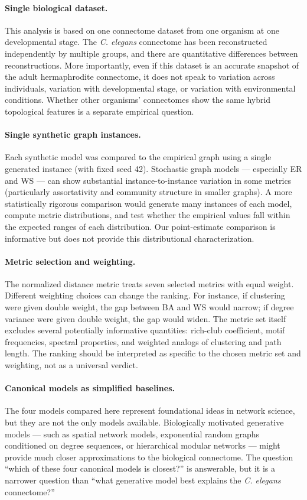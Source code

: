 \documentclass[12pt,a4paper]{report}
\begin{document}
\paragraph{Single biological dataset.} This analysis is based on one connectome dataset from one organism at one developmental stage. The \textit{C. elegans} connectome has been reconstructed independently by multiple groups, and there are quantitative differences between reconstructions. More importantly, even if this dataset is an accurate snapshot of the adult hermaphrodite connectome, it does not speak to variation across individuals, variation with developmental stage, or variation with environmental conditions. Whether other organisms' connectomes show the same hybrid topological features is a separate empirical question.

\paragraph{Single synthetic graph instances.} Each synthetic model was compared to the empirical graph using a single generated instance (with fixed seed 42). Stochastic graph models — especially ER and WS — can show substantial instance-to-instance variation in some metrics (particularly assortativity and community structure in smaller graphs). A more statistically rigorous comparison would generate many instances of each model, compute metric distributions, and test whether the empirical values fall within the expected ranges of each distribution. Our point-estimate comparison is informative but does not provide this distributional characterization.

\paragraph{Metric selection and weighting.} The normalized distance metric treats seven selected metrics with equal weight. Different weighting choices can change the ranking. For instance, if clustering were given double weight, the gap between BA and WS would narrow; if degree variance were given double weight, the gap would widen. The metric set itself excludes several potentially informative quantities: rich-club coefficient, motif frequencies, spectral properties, and weighted analogs of clustering and path length. The ranking should be interpreted as specific to the chosen metric set and weighting, not as a universal verdict.

\paragraph{Canonical models as simplified baselines.} The four models compared here represent foundational ideas in network science, but they are not the only models available. Biologically motivated generative models — such as spatial network models, exponential random graphs conditioned on degree sequences, or hierarchical modular networks — might provide much closer approximations to the biological connectome. The question ``which of these four canonical models is closest?'' is answerable, but it is a narrower question than ``what generative model best explains the \textit{C. elegans} connectome?''
\end{document}
